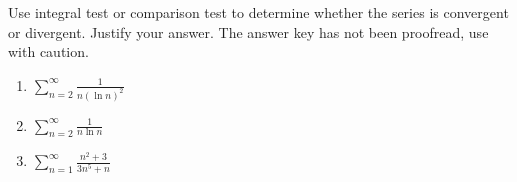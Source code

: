 Use integral test or comparison test to determine whether the series is convergent or divergent. Justify your answer. The answer key has not been proofread, use with caution.
\begin{enumerate}
\item $\displaystyle \sum\limits_{n=2}^{\infty}\frac{1}{n(\ln n)^2}$
\item $\displaystyle \sum\limits_{n=2}^{\infty}\frac{1}{n\ln n}$
\item $\displaystyle \sum\limits_{n=1}^{\infty}\frac{n^2+3}{3n^5+n}$
\end{enumerate}
